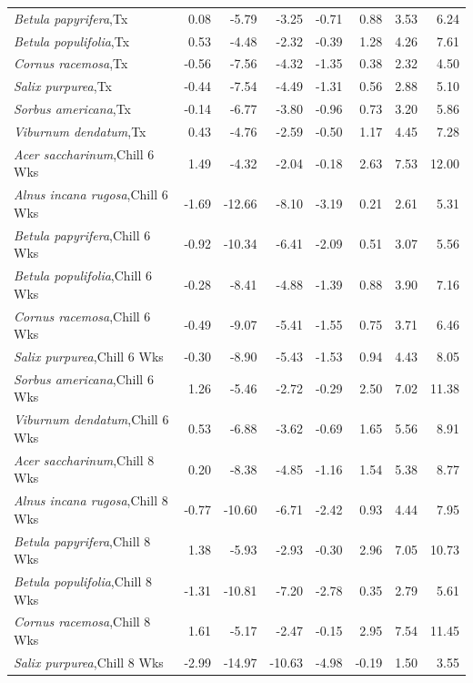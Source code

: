 \documentclass{article}\usepackage[]{graphicx}\usepackage[]{color}
\begin{document}
\begin{longtable}{lrrrrrrr}
  \textit{Betula papyrifera},Tx & 0.08 & -5.79 & -3.25 & -0.71 & 0.88 & 3.53 & 6.24 \\ 
  \textit{Betula populifolia},Tx & 0.53 & -4.48 & -2.32 & -0.39 & 1.28 & 4.26 & 7.61 \\ 
  \textit{Cornus racemosa},Tx & -0.56 & -7.56 & -4.32 & -1.35 & 0.38 & 2.32 & 4.50 \\ 
  \textit{Salix purpurea},Tx & -0.44 & -7.54 & -4.49 & -1.31 & 0.56 & 2.88 & 5.10 \\ 
  \textit{Sorbus americana},Tx & -0.14 & -6.77 & -3.80 & -0.96 & 0.73 & 3.20 & 5.86 \\ 
  \textit{Viburnum dendatum},Tx & 0.43 & -4.76 & -2.59 & -0.50 & 1.17 & 4.45 & 7.28 \\ 
  \textit{Acer saccharinum},Chill 6 Wks & 1.49 & -4.32 & -2.04 & -0.18 & 2.63 & 7.53 & 12.00 \\ 
  \textit{Alnus incana rugosa},Chill 6 Wks & -1.69 & -12.66 & -8.10 & -3.19 & 0.21 & 2.61 & 5.31 \\ 
  \textit{Betula papyrifera},Chill 6 Wks & -0.92 & -10.34 & -6.41 & -2.09 & 0.51 & 3.07 & 5.56 \\ 
  \textit{Betula populifolia},Chill 6 Wks & -0.28 & -8.41 & -4.88 & -1.39 & 0.88 & 3.90 & 7.16 \\ 
  \textit{Cornus racemosa},Chill 6 Wks & -0.49 & -9.07 & -5.41 & -1.55 & 0.75 & 3.71 & 6.46 \\ 
  \textit{Salix purpurea},Chill 6 Wks & -0.30 & -8.90 & -5.43 & -1.53 & 0.94 & 4.43 & 8.05 \\ 
  \textit{Sorbus americana},Chill 6 Wks & 1.26 & -5.46 & -2.72 & -0.29 & 2.50 & 7.02 & 11.38 \\ 
  \textit{Viburnum dendatum},Chill 6 Wks & 0.53 & -6.88 & -3.62 & -0.69 & 1.65 & 5.56 & 8.91 \\ 
  \textit{Acer saccharinum},Chill 8 Wks & 0.20 & -8.38 & -4.85 & -1.16 & 1.54 & 5.38 & 8.77 \\ 
  \textit{Alnus incana rugosa},Chill 8 Wks & -0.77 & -10.60 & -6.71 & -2.42 & 0.93 & 4.44 & 7.95 \\ 
  \textit{Betula papyrifera},Chill 8 Wks & 1.38 & -5.93 & -2.93 & -0.30 & 2.96 & 7.05 & 10.73 \\ 
  \textit{Betula populifolia},Chill 8 Wks & -1.31 & -10.81 & -7.20 & -2.78 & 0.35 & 2.79 & 5.61 \\ 
  \textit{Cornus racemosa},Chill 8 Wks & 1.61 & -5.17 & -2.47 & -0.15 & 2.95 & 7.54 & 11.45 \\ 
  \textit{Salix purpurea},Chill 8 Wks & -2.99 & -14.97 & -10.63 & -4.98 & -0.19 & 1.50 & 3.55 \\ 

\end{longtable}
\end{document}
